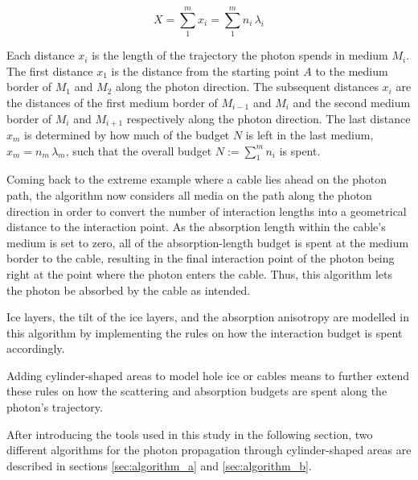 $$
  X = \sum_1^m x_i = \sum_1^m n_i\,\lambda_i
$$

Each distance $x_i$ is the length of the trajectory the photon spends in medium $M_i$. The first distance $x_1$ is the distance from the starting point $A$ to the medium border of $M_1$ and $M_2$ along the photon direction. The subsequent distances $x_i$ are the distances of the first medium border of $M_{i-1}$ and $M_i$ and the second medium border of $M_i$ and $M_{i+1}$ respectively along the photon direction. The last distance $x_m$ is determined by how much of the budget $N$ is left in the last medium, $x_m = n_m\,\lambda_m$, such that the overall budget $N:=\sum_1^m n_i$ is spent.


Coming back to the extreme example where a cable lies ahead on the photon path, the algorithm now considers all media on the path along the photon direction in order to convert the number of interaction lengths into a geometrical distance to the interaction point. As the absorption length within the cable's medium is set to zero, all of the absorption-length budget is spent at the medium border to the cable, resulting in the final interaction point of the photon being right at the point where the photon enters the cable. Thus, this algorithm lets the photon be absorbed by the cable as intended.

Ice layers, the tilt of the ice layers, and the absorption anisotropy are modelled in this algorithm by implementing the rules on how the interaction budget is spent accordingly.

Adding cylinder-shaped areas to model hole ice or cables means to further extend these rules on how the scattering and absorption budgets are spent along the photon's trajectory.

After introducing the tools used in this study in the following section, two different algorithms for the photon propagation through cylinder-shaped areas are described in sections \ref{sec:algorithm_a} and \ref{sec:algorithm_b}.
